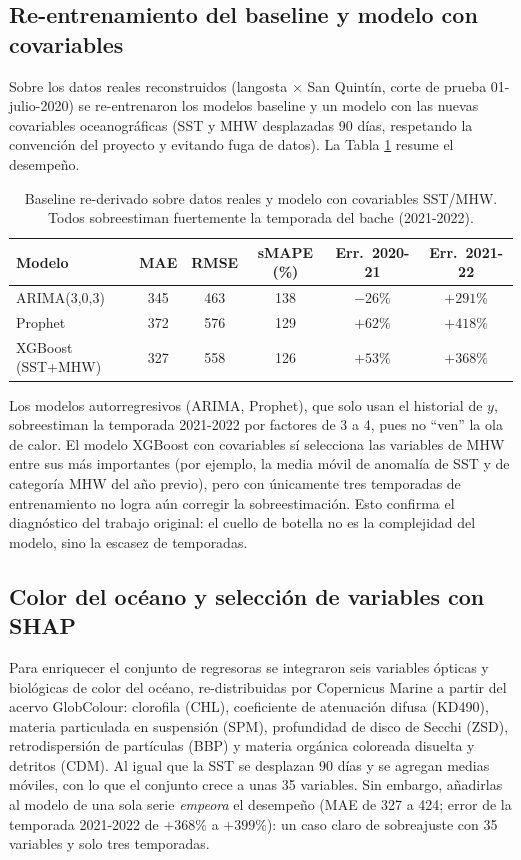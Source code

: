 \subsection{Re-entrenamiento del baseline y modelo con covariables}
Sobre los datos reales reconstruidos (langosta $\times$ San Quintín, corte de prueba 01-julio-2020) se re-entrenaron los modelos baseline y un modelo con las nuevas covariables oceanográficas (SST y MHW desplazadas 90 días, respetando la convención del proyecto y evitando fuga de datos). La Tabla \ref{tab:extension_floor} resume el desempeño.

\begin{table}[htbp]
\centering
\small
\begin{tabular}{lccccc}
\toprule
Modelo & MAE & RMSE & sMAPE (\%) & Err.\ 2020-21 & Err.\ 2021-22 \\
\midrule
ARIMA(3,0,3) & 345 & 463 & 138 & $-26\%$ & $+291\%$ \\
Prophet & 372 & 576 & 129 & $+62\%$ & $+418\%$ \\
XGBoost (SST+MHW) & 327 & 558 & 126 & $+53\%$ & $+368\%$ \\
\bottomrule
\end{tabular}
\caption{Baseline re-derivado sobre datos reales y modelo con covariables SST/MHW. Todos sobreestiman fuertemente la temporada del bache (2021-2022).}
\label{tab:extension_floor}
\end{table}

Los modelos autorregresivos (ARIMA, Prophet), que solo usan el historial de $y$, sobreestiman la temporada 2021-2022 por factores de 3 a 4, pues no ``ven'' la ola de calor. El modelo XGBoost con covariables sí selecciona las variables de MHW entre sus más importantes (por ejemplo, la media móvil de anomalía de SST y de categoría MHW del año previo), pero con únicamente tres temporadas de entrenamiento no logra aún corregir la sobreestimación. Esto confirma el diagnóstico del trabajo original: el cuello de botella no es la complejidad del modelo, sino la escasez de temporadas.

\subsection{Color del océano y selección de variables con SHAP}
Para enriquecer el conjunto de regresoras se integraron seis variables ópticas y biológicas de color del océano, re-distribuidas por Copernicus Marine a partir del acervo GlobColour: clorofila (CHL), coeficiente de atenuación difusa (KD490), materia particulada en suspensión (SPM), profundidad de disco de Secchi (ZSD), retrodispersión de partículas (BBP) y materia orgánica coloreada disuelta y detritos (CDM). Al igual que la SST se desplazan 90 días y se agregan medias móviles, con lo que el conjunto crece a unas 35 variables. Sin embargo, añadirlas al modelo de una sola serie \emph{empeora} el desempeño (MAE de 327 a 424; error de la temporada 2021-2022 de $+368\%$ a $+399\%$): un caso claro de sobreajuste con 35 variables y solo tres temporadas.

